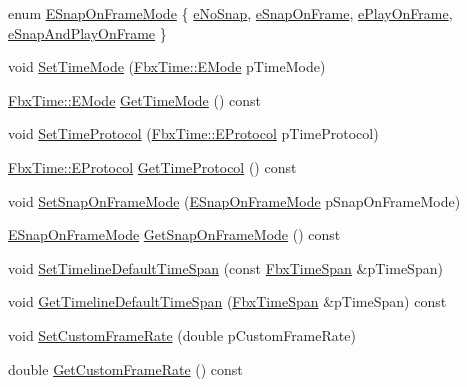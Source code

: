 \begin{DoxyCompactItemize}
\item 
enum \hyperlink{class_fbx_global_settings_ada0423e32bb00b73cb43b94d54c54b4a}{E\+Snap\+On\+Frame\+Mode} \{ \hyperlink{class_fbx_global_settings_ada0423e32bb00b73cb43b94d54c54b4aa8be027fb209b6d7c9217f83d63bfe1f3}{e\+No\+Snap}, 
\hyperlink{class_fbx_global_settings_ada0423e32bb00b73cb43b94d54c54b4aa8c3a7be022764e51600e7128725ab74a}{e\+Snap\+On\+Frame}, 
\hyperlink{class_fbx_global_settings_ada0423e32bb00b73cb43b94d54c54b4aa0f6d2833b7029016b80bc42ef7e25433}{e\+Play\+On\+Frame}, 
\hyperlink{class_fbx_global_settings_ada0423e32bb00b73cb43b94d54c54b4aa46219a7a0a88effe8daa2a1f41694796}{e\+Snap\+And\+Play\+On\+Frame}
 \}
\item 
void \hyperlink{class_fbx_global_settings_a7356a58403a96b96f9d4a5d8513dc731}{Set\+Time\+Mode} (\hyperlink{class_fbx_time_acc529b00a0e8d4c3da3702449ca93031}{Fbx\+Time\+::\+E\+Mode} p\+Time\+Mode)
\item 
\hyperlink{class_fbx_time_acc529b00a0e8d4c3da3702449ca93031}{Fbx\+Time\+::\+E\+Mode} \hyperlink{class_fbx_global_settings_af9b3a1685ccc3ed00f8addec82ca8a23}{Get\+Time\+Mode} () const
\item 
void \hyperlink{class_fbx_global_settings_ac3116e61ac13970a735d641b40b44382}{Set\+Time\+Protocol} (\hyperlink{class_fbx_time_a10ffa1fdce0aa7f63ec24bdd23afff4b}{Fbx\+Time\+::\+E\+Protocol} p\+Time\+Protocol)
\item 
\hyperlink{class_fbx_time_a10ffa1fdce0aa7f63ec24bdd23afff4b}{Fbx\+Time\+::\+E\+Protocol} \hyperlink{class_fbx_global_settings_a1514e7da28ac65299ee142c3376fb4e7}{Get\+Time\+Protocol} () const
\item 
void \hyperlink{class_fbx_global_settings_a4437203e7bfa3463d234154c9e3dc0c2}{Set\+Snap\+On\+Frame\+Mode} (\hyperlink{class_fbx_global_settings_ada0423e32bb00b73cb43b94d54c54b4a}{E\+Snap\+On\+Frame\+Mode} p\+Snap\+On\+Frame\+Mode)
\item 
\hyperlink{class_fbx_global_settings_ada0423e32bb00b73cb43b94d54c54b4a}{E\+Snap\+On\+Frame\+Mode} \hyperlink{class_fbx_global_settings_a2f7b9c64f16aed022e95504944076cf1}{Get\+Snap\+On\+Frame\+Mode} () const
\item 
void \hyperlink{class_fbx_global_settings_a5630686adea391bf0dc542380c8d89fe}{Set\+Timeline\+Default\+Time\+Span} (const \hyperlink{class_fbx_time_span}{Fbx\+Time\+Span} \&p\+Time\+Span)
\item 
void \hyperlink{class_fbx_global_settings_a1b2f291c9da96c693c79bcd6a4115648}{Get\+Timeline\+Default\+Time\+Span} (\hyperlink{class_fbx_time_span}{Fbx\+Time\+Span} \&p\+Time\+Span) const
\item 
void \hyperlink{class_fbx_global_settings_a12426551edf226877e000f3ca00e93b1}{Set\+Custom\+Frame\+Rate} (double p\+Custom\+Frame\+Rate)
\item 
double \hyperlink{class_fbx_global_settings_a70888edefedf6502041a00f0751e2f11}{Get\+Custom\+Frame\+Rate} () const
\end{DoxyCompactItemize}
